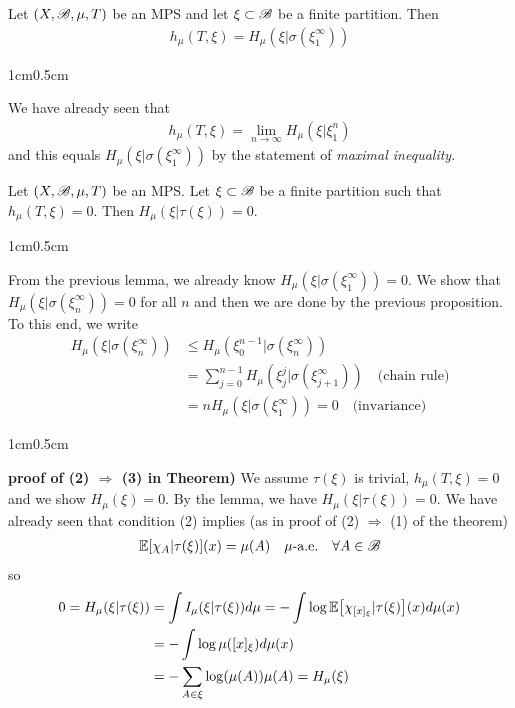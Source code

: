\documentclass[12pt,a4paper]{report}
\newenvironment{proof}
{\begin{changemargin}{1cm}{0.5cm} 
	}%
	{\end{changemargin}
}
\begin{document}
\lem Let $(X, \mathscr{B}, \mu, T)$ be an MPS and let $\xi \subset \mathscr{B}$ be a finite partition. Then
\begin{align*}
h_{\mu} (T, \xi ) = H_{\mu}(\xi | \sigma(\xi_1^{\infty}))
\end{align*}
\begin{proof}
\pf We have already seen that
\begin{align*}
h_{\mu}(T, \xi )= \lim_{n\rightarrow \infty} H_{\mu}(\xi | \xi_1^n) 
\end{align*}
and this equals $H_{\mu}(\xi | \sigma(\xi_1^{\infty}))$ by the statement of \emph{maximal inequality}.

\eop
\end{proof}
\s

\lem Let $(X,\mathscr{B}, \mu, T)$ be an MPS. Let $\xi \subset \mathscr{B}$ be a finite partition such that $h_{\mu}(T, \xi) =0$. Then $H_{\mu}(\xi | \tau(\xi)) =0$. 
\begin{proof}
\pf From the previous lemma, we already know $H_{\mu}(\xi | \sigma(\xi_1^{\infty})) =0$. We show that $H_{\mu}(\xi | \sigma(\xi_n^{\infty})) =0$ for all $n$ and then we are done by the previous proposition. To this end, we write
\begin{align*}
H_{\mu}(\xi | \sigma(\xi_n^{\infty})) &\leq H_{\mu} (\xi_0^{n-1} | \sigma(\xi_n^{\infty})) \\
&= \sum_{j=0}^{n-1} H_{\mu}(\xi_j^j | \sigma(\xi_{j+1}^{\infty})) \quad \text{(chain rule)} \\
&= nH_{\mu}(\xi | \sigma(\xi_1^{\infty})) =0 \quad \text{(invariance)}
\end{align*}

\eop
\end{proof}
\s

\begin{proof}
\textbf{proof of (2) $\Rightarrow$ (3) in Theorem)} We assume $\tau (\xi)$ is trivial, $h_{\mu}(T, \xi) =0$ and we show $H_{\mu}(\xi) =0$. By the lemma, we have $H_{\mu}(\xi | \tau(\xi)) =0$. We have already seen that condition (2) implies (as in proof of (2) $\Rightarrow$ (1) of the theorem)
\begin{align*}
\mathbb{E} [\chi_A | \tau(\xi)](x) = \mu(A) \quad \mu \text{-a.e.} \quad \forall A \in \mathscr{B}
\end{align*}
so
\begin{align*}
0=H_{\mu}(\xi | \tau(\xi)) &= \int I_{\mu}(\xi | \tau(\xi))d\mu = -\int \log \mathbb{E} \big[ \chi_{[x]_{\xi}} | \tau(\xi) \big](x) d\mu(x) \\
&= - \int \log \mu([x]_{\xi}) d\mu(x) \\
&= - \sum_{A \in \xi} \log( \mu(A)) \mu(A) = H_{\mu} (\xi)
\end{align*}
\end{proof}
\end{document}
